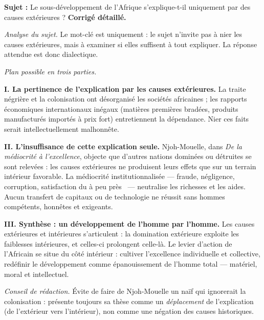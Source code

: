 \documentclass[11pt]{article}
\begin{document}
\begin{exoresolu}
\textbf{Sujet :} \guillemotleft Le sous-développement de l'Afrique s'explique-t-il uniquement par des causes extérieures ? \guillemotright
\tcblower
\textbf{Corrigé détaillé.}

\emph{Analyse du sujet.} Le mot-clé est \guillemotleft uniquement \guillemotright : le sujet n'invite pas à nier les causes extérieures, mais à examiner si elles suffisent à tout expliquer. La réponse attendue est donc dialectique.

\emph{Plan possible en trois parties.}

\textbf{I. La pertinence de l'explication par les causes extérieures.} La traite négrière et la colonisation ont désorganisé les sociétés africaines ; les rapports économiques internationaux inégaux (matières premières bradées, produits manufacturés importés à prix fort) entretiennent la dépendance. Nier ces faits serait intellectuellement malhonnête.

\textbf{II. L'insuffisance de cette explication seule.} Njoh-Mouelle, dans \emph{De la médiocrité à l'excellence}, objecte que d'autres nations dominées ou détruites se sont relevées : les causes extérieures ne produisent leurs effets que sur un terrain intérieur favorable. La médiocrité institutionnalisée — fraude, négligence, corruption, satisfaction du \guillemotleft à peu près \guillemotright\ — neutralise les richesses et les aides. Aucun transfert de capitaux ou de technologie ne réussit sans hommes compétents, honnêtes et exigeants.

\textbf{III. Synthèse : un développement de l'homme par l'homme.} Les causes extérieures et intérieures s'articulent : la domination extérieure exploite les faiblesses intérieures, et celles-ci prolongent celle-là. Le levier d'action de l'Africain se situe du côté intérieur : cultiver l'excellence individuelle et collective, redéfinir le développement comme épanouissement de l'homme total — matériel, moral et intellectuel.

\emph{Conseil de rédaction.} Évite de faire de Njoh-Mouelle un naïf qui ignorerait la colonisation : présente toujours sa thèse comme un \emph{déplacement} de l'explication (de l'extérieur vers l'intérieur), non comme une négation des causes historiques.
\end{exoresolu}
\end{document}

